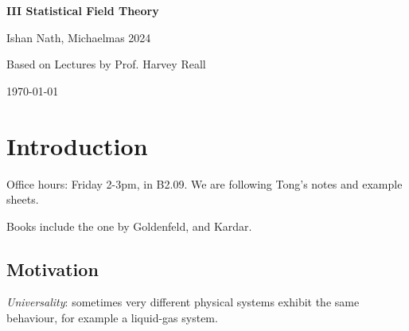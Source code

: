 \documentclass[12pt]{article}
\begin{document}
\hypersetup{pageanchor=false}
\begin{titlepage}
	\begin{center}
		\vspace*{1em}
		\Huge
		\textbf{III Statistical Field Theory}

		\vspace{1em}
		\large
		Ishan Nath, Michaelmas 2024

		\vspace{1.5em}

		\Large

		Based on Lectures by Prof. Harvey Reall

		\vspace{1em}

		\large
		\today
	\end{center}
	
\end{titlepage}
\hypersetup{pageanchor=true}

\tableofcontents

\newpage


\setcounter{section}{-1}

\section{Introduction}%
\label{sec:intro}

Office hours: Friday 2-3pm, in B2.09. We are following Tong's notes and example sheets.

Books include the one by Goldenfeld, and Kardar.

\subsection{Motivation}%
\label{sub:motive}

\emph{Universality}: sometimes very different physical systems exhibit the same behaviour, for example a liquid-gas system.
\end{document}
